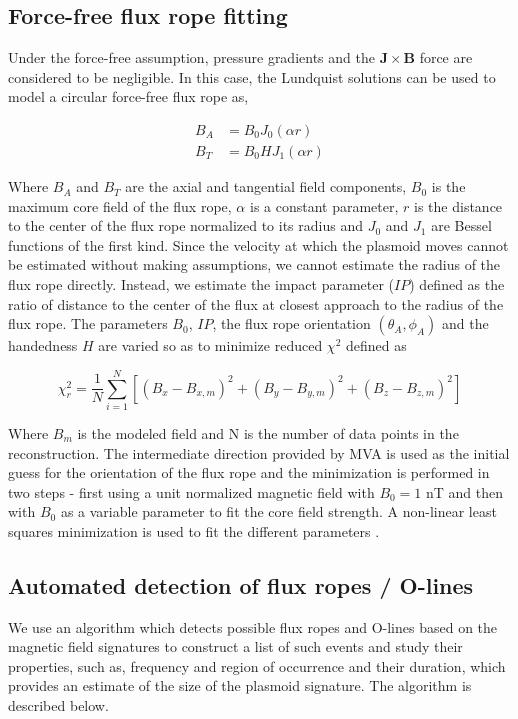 \subsection{Force-free flux rope fitting}
Under the force-free assumption, pressure gradients and the $\mathbf{J}\times\mathbf{B}$ force are considered to be negligible. In this case, the Lundquist solutions can be used to model a circular force-free flux rope \cite{Lepping1990MagneticAU,Slavin2003GeotailSheet} as, 

\begin{align}
    B_A & = B_0 J_0 \left( \alpha r \right)\\
    B_T & = B_0 H J_1 \left( \alpha r \right)
\end{align}

Where $B_A$ and $B_T$ are the axial and tangential field components, $B_0$ is the maximum core field of the flux rope, $\alpha$ is a constant parameter, $r$ is the distance to the center of the flux rope normalized to its radius and $J_0$ and $J_1$ are Bessel functions of the first kind. Since the velocity at which the plasmoid moves cannot be estimated without making assumptions, we cannot estimate the radius of the flux rope directly. Instead, we estimate the impact parameter ($IP$) defined as the ratio of distance to the center of the flux at closest approach to the radius of the flux rope. The parameters $B_0$, $IP$, the flux rope orientation $(\theta_A, \phi_A)$ and the handedness $H$ are varied so as to minimize reduced $\chi^2$ defined as \cite{Lepping1990MagneticAU}

\begin{equation}
    \chi_r^2 = \frac{1}{N} \sum_{i=1}^{N} \left[ \left(B_x - B_{x,m} \right)^2 + \left(B_y - B_{y,m} \right)^2 + \left(B_z - B_{z,m} \right)^2 \right]
\end{equation}

Where $B_m$ is the modeled field and N is the number of data points in the reconstruction. The intermediate direction provided by MVA is used as the initial guess for the orientation of the flux rope  and the minimization is performed in two steps - first using a unit normalized magnetic field with $B_0=1$ nT and then with $B_0$ as a variable parameter to fit the core field strength. A non-linear least squares minimization is used to fit the different parameters \cite{Newville2018Non-LinearPython}. 

\subsection{Automated detection of flux ropes / O-lines}
\label{subsec:algorithm-fluxrope}
We use an algorithm which detects possible flux ropes and O-lines based on the magnetic field signatures to construct a list of such events and study their properties, such as, frequency and region of occurrence and their duration, which provides an estimate of the size of the plasmoid signature. The algorithm is described below. 


